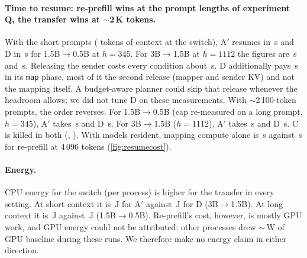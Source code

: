 \paragraph{Time to resume: re-prefill wins at the prompt lengths of experiment Q, the transfer wins at $\sim$2\,K tokens.}
With the short prompts ( tokens of context at the switch), A$'$ resumes in \,s and D in \,s for 1.5B$\to$0.5B at $h=345$.
For 3B$\to$1.5B at $h=1112$ the figures are \,s and \,s.
Releasing the sender costs every condition about \,s.
D additionally pays \,s in its \texttt{map} phase, most of it the second release (mapper and sender KV) and not the mapping itself.
A budget-aware planner could skip that release whenever the headroom allows; we did not tune D on these measurements.
With ${\sim}$2\,100-token prompts, the order reverses.
For 1.5B$\to$0.5B (cap re-measured on a long prompt, $h=345$), A$'$ takes \,s and D \,s.
For 3B$\to$1.5B ($h=1112$), A$'$ takes \,s and D \,s.
C is killed in both (, ).
With models resident, mapping compute alone is \,s against \,s for re-prefill at 4\,096 tokens (\cref{fig:resumecost}).

\paragraph{Energy.}
CPU energy for the switch (per process) is higher for the transfer in every setting.
At short context it is \,J for A$'$ against \,J for D (3B$\to$1.5B).
At long context it is \,J against \,J (1.5B$\to$0.5B).
Re-prefill's cost, however, is mostly GPU work, and GPU energy could not be attributed: other processes drew $\sim$\,W of GPU baseline during these runs.
We therefore make no energy claim in either direction.
